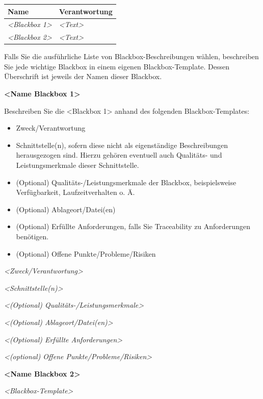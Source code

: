 \begin{longtable}[]{@{}ll@{}}
\toprule
Name & Verantwortung\tabularnewline
\midrule
\endhead
\emph{\textless Blackbox 1\textgreater{}} &
\emph{\textless Text\textgreater{}}\tabularnewline
\emph{\textless Blackbox 2\textgreater{}} &
\emph{\textless Text\textgreater{}}\tabularnewline
\bottomrule
\end{longtable}

Falls Sie die ausführliche Liste von Blackbox-Beschreibungen wählen,
beschreiben Sie jede wichtige Blackbox in einem eigenen
Blackbox-Template. Dessen Überschrift ist jeweils der Namen dieser
Blackbox.

\textbf{\textless Name Blackbox 1\textgreater{}}

Beschreiben Sie die \textless Blackbox 1\textgreater{} anhand des
folgenden Blackbox-Templates:

\begin{itemize}
\tightlist
\item
  Zweck/Verantwortung
\item
  Schnittstelle(n), sofern diese nicht als eigenständige Beschreibungen
  herausgezogen sind. Hierzu gehören eventuell auch Qualitäts- und
  Leistungsmerkmale dieser Schnittstelle.
\item
  (Optional) Qualitäts-/Leistungsmerkmale der Blackbox, beispielsweise
  Verfügbarkeit, Laufzeitverhalten o. Ä.
\item
  (Optional) Ablageort/Datei(en)
\item
  (Optional) Erfüllte Anforderungen, falls Sie Traceability zu
  Anforderungen benötigen.
\item
  (Optional) Offene Punkte/Probleme/Risiken
\end{itemize}

\emph{\textless Zweck/Verantwortung\textgreater{}}

\emph{\textless Schnittstelle(n)\textgreater{}}

\emph{\textless(Optional) Qualitäts-/Leistungsmerkmale\textgreater{}}

\emph{\textless(Optional) Ablageort/Datei(en)\textgreater{}}

\emph{\textless(Optional) Erfüllte Anforderungen\textgreater{}}

\emph{\textless(optional) Offene Punkte/Probleme/Risiken\textgreater{}}

\textbf{\textless Name Blackbox 2\textgreater{}}

\emph{\textless Blackbox-Template\textgreater{}}

